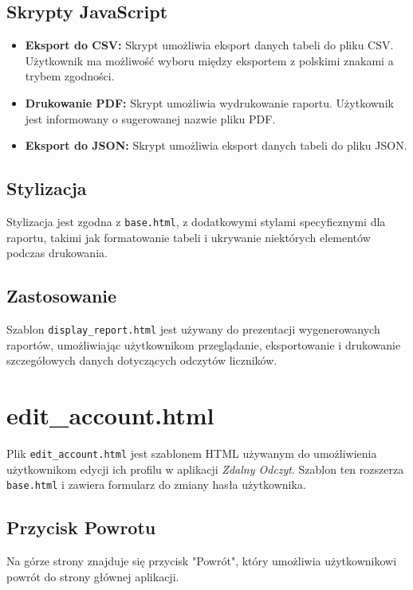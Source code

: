 \documentclass[12pt,a4paper]{report}
\begin{document}
\subsection{Skrypty JavaScript}
\begin{itemize}
\item \textbf{Eksport do CSV:} Skrypt umożliwia eksport danych tabeli do pliku CSV. Użytkownik ma możliwość wyboru między eksportem z polskimi znakami a trybem zgodności.
\item \textbf{Drukowanie PDF:} Skrypt umożliwia wydrukowanie raportu. Użytkownik jest informowany o sugerowanej nazwie pliku PDF.
\item \textbf{Eksport do JSON:} Skrypt umożliwia eksport danych tabeli do pliku JSON.
\end{itemize}

\subsection{Stylizacja}
Stylizacja jest zgodna z \texttt{base.html}, z dodatkowymi stylami specyficznymi dla raportu, takimi jak formatowanie tabeli i ukrywanie niektórych elementów podczas drukowania.

\subsection{Zastosowanie}
Szablon \texttt{display\_report.html} jest używany do prezentacji wygenerowanych raportów, umożliwiając użytkownikom przeglądanie, eksportowanie i drukowanie szczegółowych danych dotyczących odczytów liczników.



\section{edit\_account.html}
\label{sec:editaccount}
Plik \texttt{edit\_account.html} jest szablonem HTML używanym do umożliwienia użytkownikom edycji ich profilu w aplikacji \textit{Zdalny Odczyt}. Szablon ten rozszerza \texttt{base.html} i zawiera formularz do zmiany hasła użytkownika.

\subsection{Przycisk Powrotu}
Na górze strony znajduje się przycisk "Powrót", który umożliwia użytkownikowi powrót do strony głównej aplikacji.
\end{document}
